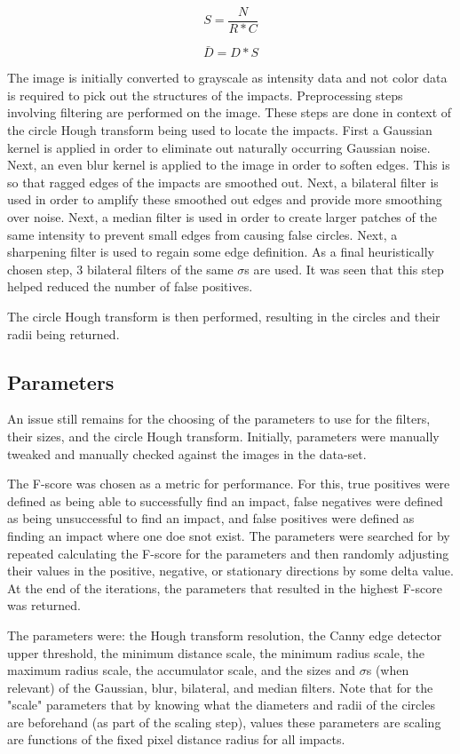 \documentclass{article}
\begin{document}
\[S = \frac{N}{R * C}\]

\[\bar{D} = D * S\]

The image is initially converted to grayscale as intensity data and not color data is required
to pick out the structures of the impacts.
Preprocessing steps involving filtering are performed on the image. These steps are done
in context of the circle Hough transform being used to locate the impacts.
First a Gaussian kernel is applied in order to eliminate out naturally occurring Gaussian noise.
Next, an even blur kernel is applied to the image in order to soften edges. This is so that
ragged edges of the impacts are smoothed out.
Next, a bilateral filter is used in order to amplify these smoothed out edges and provide 
more smoothing over noise.
Next, a median filter is used in order to create larger patches of the same intensity to 
prevent small edges from causing false circles.
Next, a sharpening filter is used to regain some edge definition.
As a final heuristically chosen step, 3 bilateral filters of the same \(\sigma{}\)s are used.
It was seen that this step helped reduced the number of false positives.

The circle Hough transform is then performed, resulting in the circles and their radii being returned.

\subsection{Parameters}
\label{ssec:parameters}
An issue still remains for the choosing of the parameters to use for the filters, their sizes, and
the circle Hough transform. Initially, parameters were manually tweaked and manually checked against
the images in the data-set.

The F-score was chosen as a metric for performance. For this, true positives
were defined as being able to successfully find an impact, false negatives were defined as
being unsuccessful to find an impact, and false positives were defined as finding an impact
where one doe snot exist.
The parameters were searched for by repeated calculating the F-score for the parameters and then
randomly adjusting their values in the positive, negative, or stationary directions by some
delta value.
At the end of the iterations, the parameters that resulted in the highest F-score was returned.

The parameters were: the Hough transform resolution, the Canny edge detector upper threshold, the minimum
distance scale, the minimum radius scale, the maximum radius scale, the accumulator scale, and the
sizes and \(\sigma{}\)s (when relevant) of the Gaussian, blur, bilateral, and median filters.
Note that for the "scale" parameters that by knowing what the diameters and radii of the circles
are beforehand (as part of the scaling step), values these parameters are scaling are functions
of the fixed pixel distance radius for all impacts.
\end{document}
